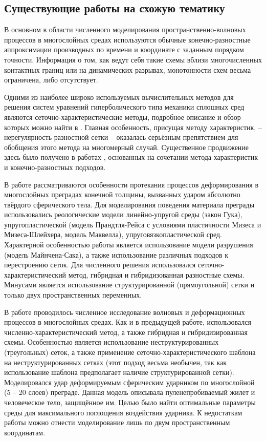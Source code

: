 \subsection*{Существующие работы на схожую тематику}
В основном в области численного моделирования пространственно-волновых процессов в многослойных средах используются обычные конечно-разностные аппроксимации производных по времени и координате с заданным порядком точности. Информация о том, как ведут себя такие схемы вблизи многочисленных контактных границ или на динамических разрывах, монотонности схем весьма ограничена, либо отсутствует.

Одними из наиболее широко используемых вычислительных методов для решения систем уравнений гиперболического типа механики сплошных сред являются сеточно-характеристические методы, подробное описание и обзор которых можно найти в \cite{magomedov}. Главная особенность, присущая методу характеристик, -- нерегулярность разностной сетки -- оказалась серьёзным препятствием для обобщения этого метода на многомерный случай. Существенное продвижение здесь было получено в работах \cite{chushkin}, основанных на сочетании метода характеристик и конечно-разностных подходов.

В работе \cite{petrov_chelnokov} рассматриваются особенности протекания процессов деформирования в многослойных преградах конечной толщины, вызванных ударом абсолютно твёрдого сферического тела. Для моделирования поведения материала преграды использовались реологические модели линейно-упругой среды (закон Гука), упругопластической (модель Прандтля-Рейса с условиями пластичности Мизеса и Мизеса-Шлейхера, модель Маквелла), упруговязкопластической сред. Характерной особенностью работы является использование модели разрушения (модель Майнчена-Сака), а также использование различных подходов к перестроению сеток. Для численного решения использовался сеточно-характеристический метод, гибридная и гибридизованная разностные схемы. Минусами является использование структурированной (прямоугольной) сетки и только двух пространственных переменных.

В работе \cite{matyushev_petrov} проводилось численное исследование волновых и деформационных процессов в многослойных  средах. Как и в предыдущей работе, использовался численно-характеристический метод, а также гибридная и гибридизированная схемы. Особенностью является использование неструктурированных (треугольных) сеток, а также применение сеточно-характеристического шаблона на неструктурированных сетках (этот подход весьма необычен, так как использование шаблона предполагает наличие структурированной сетки). Моделировался удар деформируемым сферическим ударником по многослойной (5 – 20 слоев) преграде. Данная модель описывала пуленепробиваемый жилет и человеческое тело, защищённое им. Целью было найти оптимальные параметры среды для максимального поглощения воздействия ударника. К недостаткам работы можно отнести моделирование лишь по двум пространственным координатам.

